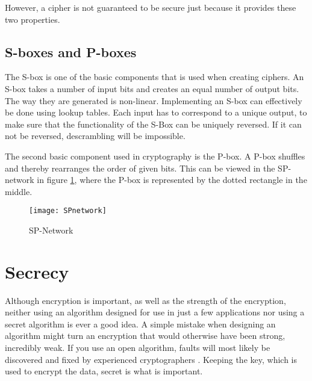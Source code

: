 However, a cipher is not guaranteed to be secure just because it 
provides these two properties.

\subsection{S-boxes and P-boxes}
The S-box is one of the basic components that is used when creating 
ciphers. An S-box takes a number of input bits and creates an equal 
number of output bits. The way they are generated is non-linear. 
Implementing an S-box can effectively be done using lookup tables. 
Each input has to correspond to a unique output, to make sure that the 
functionality of the S-Box can be uniquely reversed. If it can not be 
reversed, descrambling will be impossible. 
\citep[pp. 74--75]{Stinson:2006}

The second basic component used in cryptography is the P-box. A P-box 
shuffles and thereby rearranges the order of given bits. This can be 
viewed in the SP-network in figure \ref{img:SPNetwork}, where the P-box 
is represented by the dotted rectangle in the middle.

\begin{figure}[h!]
  \begin{center}
    \texttt{[image: SPnetwork]}
    \caption{SP-Network}
    \label{img:SPNetwork}
  \end{center}
\end{figure}


\section{Secrecy}
Although encryption is important, as well as the strength of the 
encryption, neither using an algorithm designed for use in just a few 
applications nor using a secret algorithm is ever a good idea. A simple 
mistake when designing an algorithm might turn an encryption that would 
otherwise have been strong, incredibly weak. If you use an open 
algorithm, faults will most likely be discovered and fixed by 
experienced cryptographers \citep[pp. 23]{Schneier:2003}. Keeping the 
key, which is used to encrypt the data, secret is what is important.
